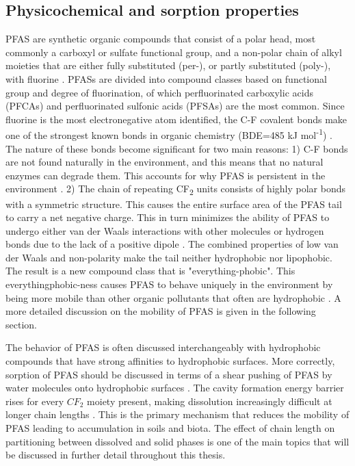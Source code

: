 \subsection{Physicochemical and sorption properties}\label{sec:physchem} 
PFAS are synthetic organic compounds that consist of a polar head, most commonly a carboxyl or sulfate functional group, and a non-polar chain of alkyl moieties that are either fully substituted (per-), or partly substituted (poly-), with fluorine \citep{wang2011physchem}. PFASs are divided into compound classes based on functional group and degree of fluorination, of which perfluorinated carboxylic acids (\acrshort{PFCA}s) and perfluorinated sulfonic acids (PFSAs) are the most common. Since fluorine is the most electronegative atom identified, the C-F covalent bonds make one of the strongest known bonds in organic chemistry (BDE=485 kJ mol\textsuperscript{-1}) \citep{Lau2007}. The nature of these bonds become significant for two main reasons: 1) C-F bonds are not found naturally in the environment, and this means that no natural enzymes can degrade them. This accounts for why PFAS is persistent in the environment \citep{hale2020persistent,krafft2015per}. 2) The chain of repeating CF\textsubscript{2} units consists of highly polar bonds with a symmetric structure. This causes the entire surface area of the PFAS tail to carry a net negative charge. This in turn minimizes the ability of PFAS to undergo either van der Waals interactions with other molecules or hydrogen bonds due to the lack of a positive dipole \citep{Arp2006}. The combined properties of low van der Waals and non-polarity make the tail neither hydrophobic nor lipophobic. The result is a new compound class that is "everything-phobic". This everythingphobic-ness causes \acrshort{PFAS} to behave uniquely in the environment by being more mobile than other organic pollutants that often are hydrophobic \citep{hale2020persistent}. A more detailed discussion on the mobility of PFAS is given in the following section.  

The behavior of PFAS is often discussed interchangeably with hydrophobic compounds that have strong affinities to hydrophobic surfaces. More correctly, sorption of PFAS should be discussed in terms of a shear pushing of PFAS by water molecules onto hydrophobic surfaces \citep{Arp2006}. The cavity formation energy barrier rises for every $CF_2$ moiety present, making dissolution increasingly difficult at longer chain lengths \citep{bhhatarai2011,Arp2006}. This is the primary mechanism that reduces the mobility of PFAS leading to accumulation in soils and biota. The effect of chain length on partitioning between dissolved and solid phases is one of the main topics that will be discussed in further detail throughout this thesis.

